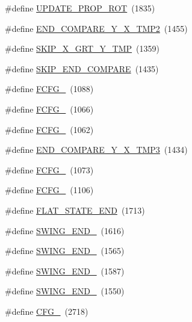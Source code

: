 \begin{DoxyCompactItemize}
\#define \hyperlink{group___d_r_i_v_e_r_s_gac90829b4b9a77480e0582bb7551e182e}{U\+P\+D\+A\+T\+E\+\_\+\+P\+R\+O\+P\+\_\+\+R\+OT}~(1835)
\item 
\#define \hyperlink{group___d_r_i_v_e_r_s_ga7b344f27570daf0f096213bfcd8e0627}{E\+N\+D\+\_\+\+C\+O\+M\+P\+A\+R\+E\+\_\+\+Y\+\_\+\+X\+\_\+\+T\+M\+P2}~(1455)
\item 
\#define \hyperlink{group___d_r_i_v_e_r_s_gab280108da935f42e6a3e30d6af04a7c1}{S\+K\+I\+P\+\_\+\+X\+\_\+\+G\+R\+T\+\_\+\+Y\+\_\+\+T\+MP}~(1359)
\item 
\#define \hyperlink{group___d_r_i_v_e_r_s_ga962a3b26ee2dd822ebc67d5ed7e01bc1}{S\+K\+I\+P\+\_\+\+E\+N\+D\+\_\+\+C\+O\+M\+P\+A\+RE}~(1435)
\item 
\#define \hyperlink{group___d_r_i_v_e_r_s_ga68df22b3699418acab9063ee5f996d8e}{F\+C\+F\+G\+\_}~(1088)
\item 
\#define \hyperlink{group___d_r_i_v_e_r_s_gac0e79063d1a071c1a8bd3f7081e4299e}{F\+C\+F\+G\+\_}~(1066)
\item 
\#define \hyperlink{group___d_r_i_v_e_r_s_ga9a7d63d6add8f9fdf9edc722a01aeb92}{F\+C\+F\+G\+\_}~(1062)
\item 
\#define \hyperlink{group___d_r_i_v_e_r_s_ga3658f219d52dff5022cc499a747ca589}{E\+N\+D\+\_\+\+C\+O\+M\+P\+A\+R\+E\+\_\+\+Y\+\_\+\+X\+\_\+\+T\+M\+P3}~(1434)
\item 
\#define \hyperlink{group___d_r_i_v_e_r_s_ga687777b4390e4a84ac774cf0600abe20}{F\+C\+F\+G\+\_}~(1073)
\item 
\#define \hyperlink{group___d_r_i_v_e_r_s_ga2ba17b85493f082e37d7e57f45200144}{F\+C\+F\+G\+\_}~(1106)
\item 
\#define \hyperlink{group___d_r_i_v_e_r_s_ga5c1ebd0914bd0e30766c9cbcc25c31c5}{F\+L\+A\+T\+\_\+\+S\+T\+A\+T\+E\+\_\+\+E\+ND}~(1713)
\item 
\#define \hyperlink{group___d_r_i_v_e_r_s_gaa6efdc55c49bd242ffafb9a9b227cca8}{S\+W\+I\+N\+G\+\_\+\+E\+N\+D\+\_}~(1616)
\item 
\#define \hyperlink{group___d_r_i_v_e_r_s_ga8a156eab56c25c1f9156a2751fa2155d}{S\+W\+I\+N\+G\+\_\+\+E\+N\+D\+\_}~(1565)
\item 
\#define \hyperlink{group___d_r_i_v_e_r_s_ga3ff31c1255dc1fceb7c590bc7f0b3ab0}{S\+W\+I\+N\+G\+\_\+\+E\+N\+D\+\_}~(1587)
\item 
\#define \hyperlink{group___d_r_i_v_e_r_s_ga6f4579a77f23d509cd63d4506e44fa23}{S\+W\+I\+N\+G\+\_\+\+E\+N\+D\+\_}~(1550)
\item 
\#define \hyperlink{group___d_r_i_v_e_r_s_ga3dc0e5c81e361fb871fbf63eeba82520}{C\+F\+G\+\_}~(2718)

\end{DoxyCompactItemize}
